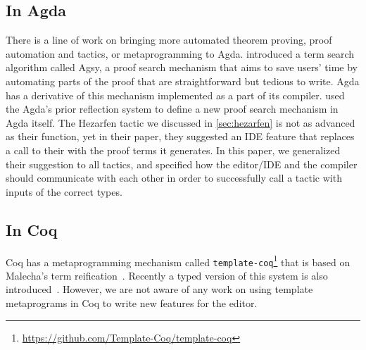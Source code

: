 \subsection{In Agda}

There is a line of work on bringing more automated theorem proving,
proof automation and tactics, or metaprogramming to Agda.
\citet{agsy} introduced a term search algorithm called
Agsy, a proof search mechanism that aims to save users' time by automating
parts of the proof that are straightforward but tedious to write.
Agda has a derivative of this mechanism implemented as a part of its compiler.
\citet{autoinagda} used the Agda's prior reflection system to define a
new proof search mechanism in Agda itself.
The Hezarfen tactic we discussed in \autoref{sec:hezarfen} is not as advanced
as their  function, yet in their paper, they suggested an IDE feature
that replaces a call to their  with the proof terms it generates.
In this paper, we generalized their suggestion to all tactics, and specified
how the editor/IDE and the compiler should communicate with each other
in order to successfully call a tactic with inputs of the correct types.

\subsection{In Coq}

Coq has a metaprogramming mechanism called
\texttt{template-coq}\footnote{\url{https://github.com/Template-Coq/template-coq}} that is based on
Malecha's term reification~\cite{malecha-phd}. Recently a typed
version of this system is also introduced~\cite{typed-template-coq}.
However, we are not aware of any work on using template metaprograms in Coq to
write new features for the editor.



